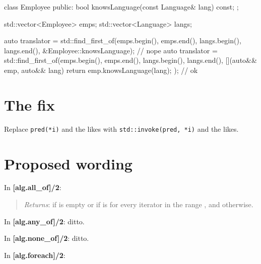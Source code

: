 \documentclass{wg21}
\newcommand{\cc}[1]{\texttt{#1}}
\begin{document}
\begin{cpp}
  class Employee
  {
  public:
      bool knowsLanguage(const Language& lang) const;
  };

  std::vector<Employee> emps;
  std::vector<Language> langs;

  auto translator = std::find_first_of(emps.begin(), emps.end(),
          langs.begin(), langs.end(),
          &Employee::knowsLanguage);                            // nope
  auto translator = std::find_first_of(emps.begin(), emps.end(),
          langs.begin(), langs.end(),
          [](auto&& emp, auto&& lang) { return emp.knowsLanguage(lang); });
                                                                // ok
\end{cpp}

\section{The fix}

Replace \cc{pred(*i)} and the likes with \cc{std::invoke(pred, *i)}
and the likes.

\section{Proposed wording}

In \textbf{[alg.all_of]/2}:
\begin{quote}
  \emph{Returns}:  if \tcode{[first, last)} is empty or if
    is
   for every iterator  in the range \tcode{[first, last)},
  and  otherwise.
\end{quote}

In \textbf{[alg.any_of]/2}: ditto.

In \textbf{[alg.none_of]/2}: ditto.

In \textbf{[alg.foreach]/2}:
\begin{quote}
\end{quote}
\end{document}
